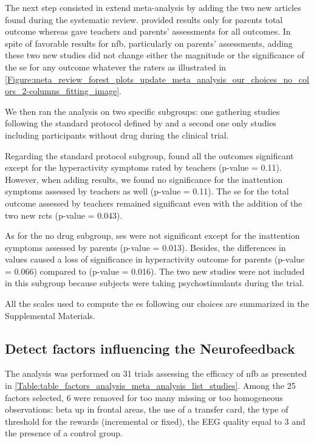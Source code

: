The next step consisted in extend \citeauthor{Cortese2016} meta-analysis by adding the two new articles \citep{Strehl2017, Baumeister2016} found 
during the systematic review. \citet{Baumeister2016} provided results only for parents total outcome whereas \citet{Strehl2017} gave teachers 
and parents' assessments for all outcomes. In spite of favorable results for \gls{nfb}, particularly on parents' assessments, adding these two 
new studies did not change either the magnitude or the significance of the \gls{se} for any outcome whatever the raters
as illustrated in \cref{Figure:meta_review_forest_plots_update_meta_analysis_our_choices_no_colors_2-columns_fitting_image}. 
 
We then ran the analysis on two specific subgroups: one gathering studies following the standard protocol defined by \citet{Arns2014}
and a second one only studies including participants without drug during the clinical trial. 

Regarding the standard protocol subgroup, \citet{Cortese2016} found all the outcomes significant except for the hyperactivity symptoms 
rated by teachers (p-value = 0.11). However, when adding \citep{Strehl2017} results, we found no significance for the inattention symptoms assessed by 
teachers as well (p-value = 0.11). The \gls{se} for the total outcome assessed by teachers remained significant even with the addition of the two new
\glspl{rct} (p-value = 0.043).

As for the no drug subgroup, \glspl{se} were not significant except for the inattention symptoms assessed by parents (p-value = 0.013). 
Besides, the differences in \citet{Arnold2014} values caused a loss of significance in hyperactivity outcome for parents (p-value = 0.066)
compared to \citet{Cortese2016} (p-value = 0.016). The two new studies were not 
included in this subgroup because subjects were taking psychostimulants during the trial.

All the scales used to compute the \gls{es} following our choices are summarized in the Supplemental Materials.

\subsection{Detect factors influencing the Neurofeedback}

The analysis was performed on 31 trials assessing the efficacy of \gls{nfb} as presented in \cref{Table:table_factors_analysis_meta_analysis_list_studies}. 
Among the 25 factors selected, 6 were removed for too many missing or too homogeneous observations: beta up in frontal areas, 
the use of a transfer card, the type of threshold for the rewards (incremental or fixed), the EEG quality equal to 3 and the presence of a control group. 

